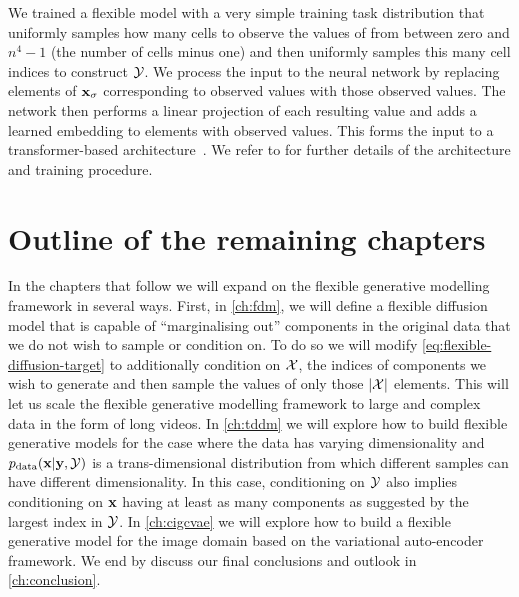 We trained a flexible model with a very simple training task distribution that uniformly samples how many cells to observe the values of from between zero and $n^4-1$ (the number of cells minus one) and then uniformly samples this many cell indices to construct ${\mathcal{Y}}$. We process the input to the neural network by replacing elements of ${\mathbf{x}}_\sigma$ corresponding to observed values with those observed values. The network then performs a linear projection of each resulting value and adds a learned embedding to elements with observed values. This forms the input to a transformer-based architecture~\citep{vaswani2017attention}. We refer to \citet{weilbach2023graphically} for further details of the architecture and training procedure.

\section{Outline of the remaining chapters}
In the chapters that follow we will expand on the flexible generative modelling framework in several ways. First, in \cref{ch:fdm}, we will define a flexible diffusion model that is capable of ``marginalising out'' components in the original data that we do not wish to sample or condition on. To do so we will modify \cref{eq:flexible-diffusion-target} to additionally condition on ${\mathcal{X}}$, the indices of components we wish to generate and then sample the values of only those $|{\mathcal{X}}|$ elements. This will let us scale the flexible generative modelling framework to large and complex data in the form of long videos. In \cref{ch:tddm} we will explore how to build flexible generative models for the case where the data has varying dimensionality and $p_{\rm{data}}({\mathbf{x}} | {\mathbf{y}}, {\mathcal{Y}})$ is a trans-dimensional distribution from which different samples can have different dimensionality. In this case, conditioning on ${\mathcal{Y}}$ also implies conditioning on ${\mathbf{x}}$ having at least as many components as suggested by the largest index in ${\mathcal{Y}}$. In \cref{ch:cigcvae} we will explore how to build a flexible generative model for the image domain based on the variational auto-encoder framework. We end by discuss our final conclusions and outlook in \cref{ch:conclusion}.

